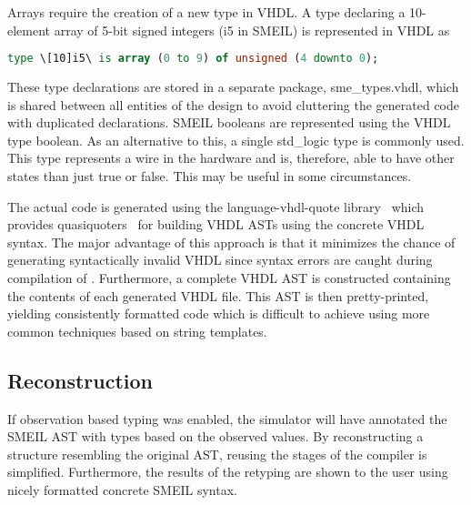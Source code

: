 Arrays require the creation of a new {\ttfamily type} in VHDL. A {\ttfamily
  type} declaring a 10-element array of 5-bit signed integers ({\ttfamily
  [10]i5} in SMEIL) is represented in VHDL as
\begin{lstlisting}[language=vhdl]
type \[10]i5\ is array (0 to 9) of unsigned (4 downto 0);
\end{lstlisting}
These type declarations are stored in a separate package, {\ttfamily sme\_types.vhdl},
which is shared between all entities of the design to avoid cluttering the
generated code with duplicated declarations. SMEIL booleans are represented
using the VHDL type {\ttfamily boolean}. As an alternative to this, a single {\ttfamily
  std\_logic} type is commonly used. This type represents a wire in the hardware
and is, therefore, able to have other states than just true or false. This may
be useful in some circumstances.

The actual code is generated using the {\ttfamily language-vhdl-quote}
library~\cite{language-vhdl-quote} which provides
quasiquoters~\cite{mainland2007s} for building VHDL ASTs using the concrete VHDL
syntax. The major advantage of this approach is that it minimizes the chance of
generating syntactically invalid VHDL since syntax errors are caught during
compilation of \libsme{}. Furthermore, a complete VHDL AST is constructed
containing the contents of each generated VHDL file. This AST is then
pretty-printed, yielding consistently formatted code which is difficult to
achieve using more common techniques based on string templates.

\subsection{Reconstruction} If observation based typing was enabled, the
simulator will have annotated the SMEIL AST with types based on the observed
values. By reconstructing a structure resembling the original AST, reusing the
stages of the compiler is simplified. Furthermore, the results of the retyping
are shown to the user using nicely formatted concrete SMEIL syntax.


